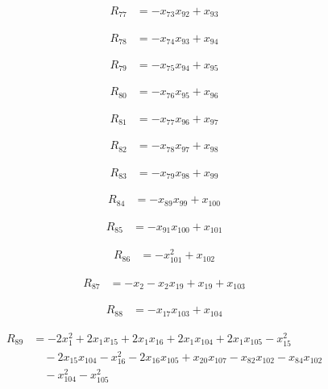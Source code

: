 \begin{align*}
R_{77} &= -x_{73} x_{92} +x_{93}
\end{align*}

\begin{align*}
R_{78} &= -x_{74} x_{93} +x_{94}
\end{align*}

\begin{align*}
R_{79} &= -x_{75} x_{94} +x_{95}
\end{align*}

\begin{align*}
R_{80} &= -x_{76} x_{95} +x_{96}
\end{align*}

\begin{align*}
R_{81} &= -x_{77} x_{96} +x_{97}
\end{align*}

\begin{align*}
R_{82} &= -x_{78} x_{97} +x_{98}
\end{align*}

\begin{align*}
R_{83} &= -x_{79} x_{98} +x_{99}
\end{align*}

\begin{align*}
R_{84} &= -x_{89} x_{99} +x_{100}
\end{align*}

\begin{align*}
R_{85} &= -x_{91} x_{100} +x_{101}
\end{align*}

\begin{align*}
R_{86} &= -x_{101}^{2} +x_{102}
\end{align*}

\begin{align*}
R_{87} &= -x_{2} -x_{2} x_{19} +x_{19} +x_{103}
\end{align*}

\begin{align*}
R_{88} &= -x_{17} x_{103} +x_{104}
\end{align*}

\begin{align*}
R_{89} &= -2 x_{1}^{2} +2 x_{1} x_{15} +2 x_{1} x_{16} +2 x_{1} x_{104} +2 x_{1} x_{105} -x_{15}^{2} \\
&\quad -2 x_{15} x_{104} -x_{16}^{2} -2 x_{16} x_{105} +x_{20} x_{107} -x_{82} x_{102} -x_{84} x_{102} \\
&\quad -x_{104}^{2} -x_{105}^{2}
\end{align*}

